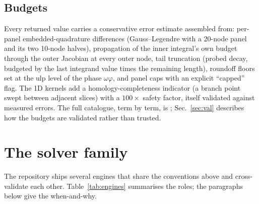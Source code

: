 \documentclass[11pt,a4paper]{article}
\begin{document}
\subsection{Budgets}
\label{sec:budgets}

Every returned value carries a conservative error estimate assembled from:
per-panel embedded-quadrature differences (Gauss--Legendre with a
20-node panel and its two 10-node halves), propagation of the inner
integral's own budget through the outer Jacobian at every outer node, tail
truncation (probed decay, budgeted by the last integrand value times the
remaining length), roundoff floors set at the ulp level of the phase
$\omega\varphi$, and panel caps with an explicit ``capped'' flag.  The
1D kernels add a homology-completeness indicator (a branch point swept
between adjacent slices) with a $100\times$ safety factor, itself validated
against measured errors.  The full catalogue, term by term, is
; Sec.~\ref{sec:val} describes how the budgets
are validated rather than trusted.

\section{The solver family}
\label{sec:engines}

The repository ships several engines that share the conventions above and
cross-validate each other.  Table~\ref{tab:engines} summarises the roles;
the paragraphs below give the when-and-why.
\end{document}
